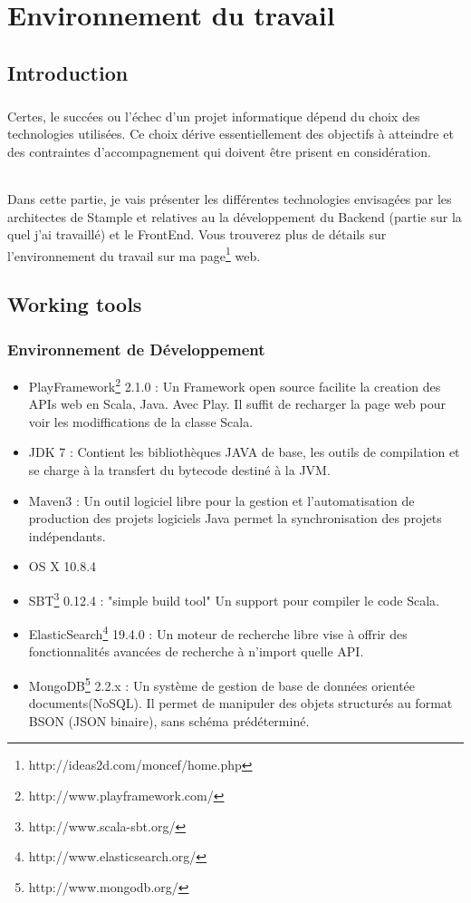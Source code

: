 \chapter{Environnement du travail}
\section{Introduction}
\paragraph{}
Certes, le succées ou l'échec d'un projet informatique dépend du choix des technologies utilisées.
Ce choix dérive essentiellement des objectifs à atteindre et des contraintes d'accompagnement qui doivent être prisent en considération.
\subparagraph{}
Dans cette partie, je vais présenter les différentes technologies envisagées par les architectes de Stample 
et relatives au la développement du Backend (partie sur la quel j'ai travaillé) et le FrontEnd.
Vous trouverez plus de détails sur l'environnement du travail sur ma page\footnote{http://ideas2d.com/moncef/home.php} web.
\section{Working tools}
\subsection{Environnement de Développement}
\begin{itemize}
\item PlayFramework\footnote{http://www.playframework.com/} 2.1.0 : Un Framework open source facilite la creation des APIs web en Scala, Java. Avec Play. Il suffit de recharger la page web pour voir les modiffications de la classe Scala.
\item JDK 7 : Contient les bibliothèques JAVA de base, les outils de compilation et se charge à la transfert du bytecode destiné à la JVM. 
\item Maven3 : Un outil logiciel libre pour la gestion et l'automatisation de production des projets logiciels Java permet la synchronisation des projets indépendants.
\item OS X 10.8.4
\item SBT\footnote{http://www.scala-sbt.org/} 0.12.4 : "simple build tool" Un support pour compiler le code Scala.
\item ElasticSearch\footnote{http://www.elasticsearch.org/} 19.4.0 :  Un moteur de recherche libre vise à offrir des fonctionnalités avancées de recherche à n'import quelle API.
\item MongoDB\footnote{http://www.mongodb.org/} 2.2.x : Un système de gestion de base de données orientée documents(NoSQL). Il permet de manipuler des objets structurés au format BSON (JSON binaire), sans schéma prédéterminé.
\end{itemize}
